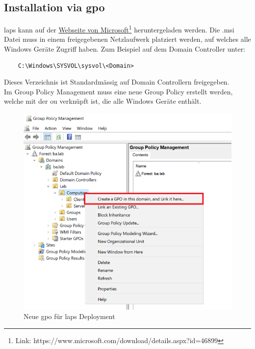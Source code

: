 \subsection{Installation via \acrshort{gpo}}
\acrshort{laps} kann auf der \href{https://www.microsoft.com/download/details.aspx?id=46899}{Webseite von Microsoft}\footnote{Link: https://www.microsoft.com/download/details.aspx?id=46899} heruntergeladen werden.
Die .msi Datei muss in einem freigegebenen Netzlaufwerk platziert werden, auf welches alle Windows Geräte Zugriff haben.
Zum Beispiel auf dem Domain Controller unter:
\begin{lstlisting}
    C:\Windows\SYSVOL\sysvol\<Domain>
\end{lstlisting}
Dieses Verzeichnis ist Standardmässig auf Domain Controllern freigegeben.\\

Im Group Policy Management muss eine neue Group Policy erstellt werden, welche mit der \acrshort{ou} verknüpft ist, die alle Windows Geräte enthält.
\begin{figure}[H]
    \centering
    \includegraphics[width=\linewidth]{../img/LAPS/GPO-Create-New.png}
    \caption{Neue \acrshort{gpo} für \acrshort{laps} Deployment}
\end{figure}

